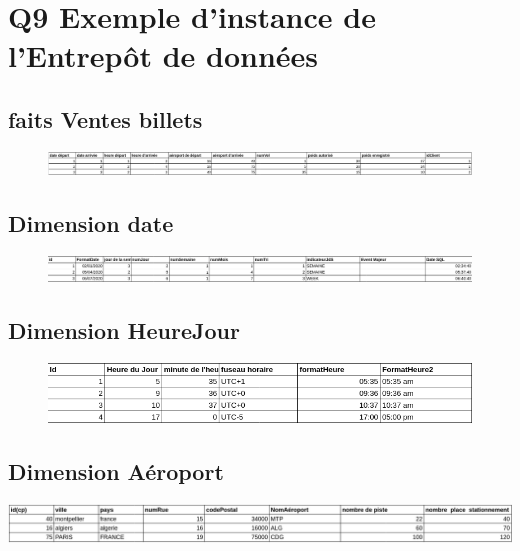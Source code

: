 \documentclass[oneside,13pt,a4paper]{article}
\begin{document}
\section{Q9 Exemple d'instance de l'Entrepôt de données}

\subsection{faits Ventes billets}
\begin{figure}[h]
  \centering
  \includegraphics[width=1\textwidth]{img/faitsVentesBillets.png}
  
\end{figure}
\subsection{Dimension date}
\begin{figure}[h]
  \centering
  \includegraphics[width=1\textwidth]{img/date.png}
  
\end{figure}

\subsection{Dimension HeureJour}
\begin{figure}[h]
  \centering
  \includegraphics[width=1\textwidth]{img/heureJour.png}
  
\end{figure}



\subsection{Dimension Aéroport}


  
  \includegraphics[width=1\textwidth]{img/aeroport.png}
  
\end{document}
